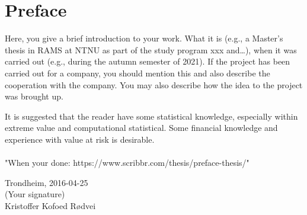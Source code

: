 \section*{Preface}


Here, you give a brief introduction to your work. What it is (e.g., a Master's thesis in RAMS at NTNU as part of the study program xxx and\ldots), when it was carried out (e.g., during the autumn semester of 2021). If the project has been carried out for a company, you should mention this and also describe the cooperation with the company. You may also describe how the idea to the project was brought up.

It is suggested that the reader have some statistical knowledge, especially within extreme value and computational statistical. Some financial knowledge and experience with value at risk is desirable.\\[2cm]
\\"When your done: https://www.scribbr.com/thesis/preface-thesis/"

\begin{center}
Trondheim, 2016-04-25\\[1pc]
(Your signature)\\[1pc]
Kristoffer Kofoed R{{\o}}dvei
\end{center}